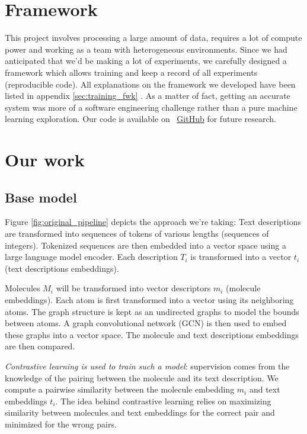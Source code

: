 \section{Framework}
\label{sec:framework_short_desc}
This project involves processing a large amount of data, requires a lot of compute power and working as a team with heterogeneous environments. Since we had anticipated that we'd be making a lot of experiments, we carefully designed a framework which allows training and keep a record of all experiments (reproducible code). All explanations on the framework we developed have been listed in appendix \ref{sec:training_fwk} . As a matter of fact, getting an accurate system was more of a software engineering challenge rather than a pure machine learning exploration. Our code is available on ~\href{https://github.com/balthazarneveu/molecule-retrieval-using-nlp}{GitHub} for future research.

\section{Our work}

\subsection*{Base model}
Figure \ref{fig:original_pipeline} depicts the approach we're taking: Text descriptions are transformed into sequences of tokens of various lengths (sequences of integers). Tokenized sequences are then embedded into a vector space using a large language model encoder.
Each description $T_{i}$ is transformed into a vector $t_{i}$ (text descriptions embeddings). 

Molecules $M_{i}$ will be transformed into vector descriptors $m_{i}$ (molecule embeddings). Each atom is first transformed into a vector using its neighboring atoms. The graph structure is kept as an undirected graphs to model the bounds between atoms. A graph convolutional network (GCN) is then used to embed these graphs into a vector space. The molecule and text descriptions embeddings are then compared. 

\textit{Contrastive learning is used to train such a model}: supervision comes from the knowledge of the pairing between the molecule and its text description. We compute a pairwise similarity between the molecule embedding $m_{i}$ and text embeddings $t_{i}$. The idea behind contrastive learning relies on maximizing similarity between molecules and text embeddings for the correct pair and minimized for the wrong pairs.

